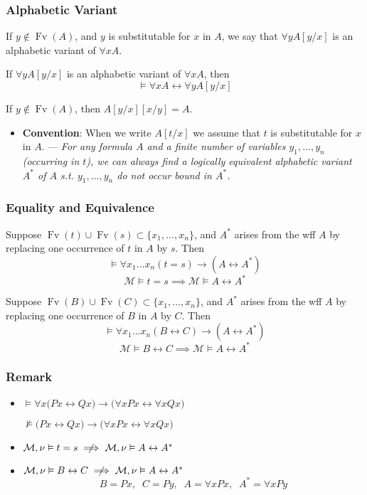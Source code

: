 \documentclass[UTF8,aspectratio=43,11pt,colorlinks,compress,openany]{beamer}%
\begin{document}
\begin{frame}\frametitle{Alphabetic Variant}
	\begin{definition}
		If $y\notin \operatorname{Fv}(A)$, and $y$ is substitutable for $x$ in $A$, we say that $\forall y A[y/x]$ is an alphabetic variant of $\forall x A$.
	\end{definition}
	\begin{theorem}
		If $\forall y A[y/x]$ is an alphabetic variant of $\forall x A$, then \[\vDash\forall x A\leftrightarrow\forall y A[y/x]\]
	\end{theorem}
	If $y\notin \operatorname{Fv}(A)$, then $A[y/x][x/y]=A$.
	\begin{itemize}
		\item \textbf{Convention}: When we write $A[t/x]$ we assume that $t$ is substitutable for $x$ in $A$. --- \textit{For any formula $A$ and a finite number of variables $y_1,\dots,y_n$ (occurring in $t$), we can always find a logically equivalent alphabetic variant $A^*$ of $A$ s.t. $y_1,\dots,y_n$ do not occur bound in $A^*$.}
	\end{itemize}
\end{frame}

\begin{frame}\frametitle{Equality and Equivalence}
	\begin{lemma}
		Suppose $\operatorname{Fv}(t)\cup \operatorname{Fv}(s)\subset\{x_1,\dots,x_n\}$, and $A^*$ arises from the wff $A$ by replacing one occurrence of $t$ in $A$ by $s$. Then
		\[\vDash\forall x_1\dots x_n(t=s)\to(A\leftrightarrow A^*)\]
		\[\mathcal{M}\vDash t=s\implies\mathcal{M}\vDash A\leftrightarrow A^*\]
	\end{lemma}
	\begin{lemma}
		Suppose $\operatorname{Fv}(B)\cup \operatorname{Fv}(C)\subset\{x_1,\dots,x_n\}$, and $A^*$ arises from the wff $A$ by replacing one occurrence of $B$ in $A$ by $C$. Then
		\[\vDash\forall x_1\dots x_n(B\leftrightarrow C)\to(A\leftrightarrow A^*)\]
		\[\mathcal{M}\vDash B\leftrightarrow C\implies\mathcal{M}\vDash A\leftrightarrow A^*\]
	\end{lemma}
\end{frame}

\begin{frame}\frametitle{Remark}
	\begin{itemize}
		\item $\vDash\forall x\bigl(Px\leftrightarrow Qx\bigr)\to\bigl(\forall x Px\leftrightarrow\forall x Qx\bigr)$
		
		$\nvDash\bigl(Px\leftrightarrow Qx\bigr)\to\bigl(\forall x Px\leftrightarrow\forall x Qx\bigr)$
		\item $\mathcal{M},\nu\vDash t=s\centernot\implies\mathcal{M},\nu\vDash A\leftrightarrow A^*$
		\item $\mathcal{M},\nu\vDash B\leftrightarrow C\centernot\implies\mathcal{M},\nu\vDash A\leftrightarrow A^*$
		\[B=Px,\;\; C=Py,\;\; A=\forall x Px,\;\; A^*=\forall x Py\]
	\end{itemize}
\end{frame}
\end{document}
